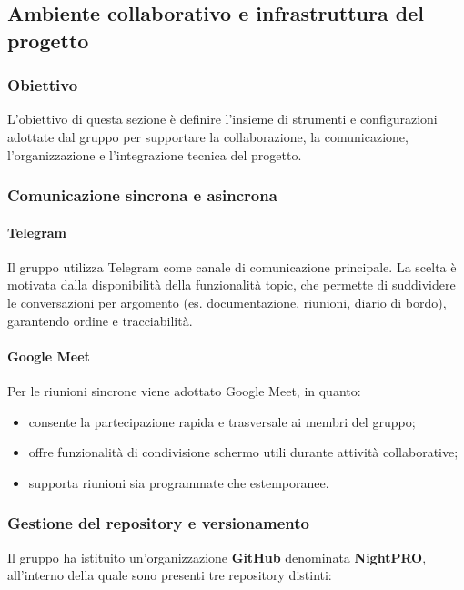 \documentclass[a4paper, 11pt, oneside]{scrartcl} %
\begin{document}
\subsection{Ambiente collaborativo e infrastruttura del progetto}

\subsubsection{Obiettivo}
L'obiettivo di questa sezione è definire l'insieme di strumenti e configurazioni adottate dal gruppo per supportare la collaborazione, la comunicazione, l’organizzazione e l’integrazione tecnica del progetto.
\subsubsection{Comunicazione sincrona e asincrona}

\paragraph{Telegram}
Il gruppo utilizza Telegram{\scriptsize{}} come canale di comunicazione principale.
La scelta è motivata dalla disponibilità della funzionalità topic{\scriptsize{}}, che permette di suddividere le conversazioni per argomento (es. documentazione, riunioni, diario di bordo), garantendo ordine e tracciabilità.
\paragraph{Google Meet}
Per le riunioni sincrone viene adottato Google Meet{\scriptsize{}}, in quanto:
\begin{itemize}
    \item consente la partecipazione rapida e trasversale ai membri del gruppo;
\item offre funzionalità di condivisione schermo utili durante attività collaborative;
    \item supporta riunioni sia programmate che estemporanee.
\end{itemize}

\subsubsection{Gestione del repository e versionamento}
Il gruppo ha istituito un’organizzazione \textbf{GitHub}{\scriptsize{}} denominata \textbf{NightPRO}, all’interno della quale sono presenti tre repository{\scriptsize{}} distinti:
\end{document}
